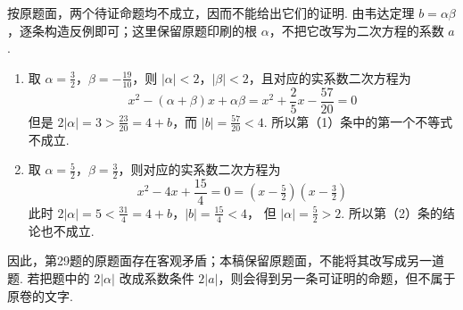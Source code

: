 \begin{solution}
按原题面，两个待证命题均不成立，因而不能给出它们的证明. 由韦达定理
\(b=\alpha\beta\)，逐条构造反例即可；这里保留原题印刷的根 \(\alpha\)，不把它改写为二次方程的系数 \(a\).

\begin{enumerate}
\item 取 \(\alpha=\frac{3}{2}\)，\(\beta=-\frac{19}{10}\)，则 \(|\alpha|<2\)，\(|\beta|<2\)，且对应的实系数二次方程为
\[
x^2-\left(\alpha+\beta\right)x+\alpha\beta=x^2+\frac{2}{5}x-\frac{57}{20}=0
\]
但是 \(2|\alpha|=3>\frac{23}{20}=4+b\)，而 \(|b|=\frac{57}{20}<4\).
所以第（1）条中的第一个不等式不成立.

\item 取 \(\alpha=\frac{5}{2}\)，\(\beta=\frac{3}{2}\)，则对应的实系数二次方程为
\[
x^2-4x+\frac{15}{4}=0=(x-\tfrac{5}{2})(x-\tfrac{3}{2})
\]
此时 \(2|\alpha|=5<\frac{31}{4}=4+b\)，\(|b|=\frac{15}{4}<4\)，
但 \(|\alpha|=\frac{5}{2}>2\). 所以第（2）条的结论也不成立.
\end{enumerate}

因此，第29题的原题面存在客观矛盾；本稿保留原题面，不能将其改写成另一道题. 若把题中的 \(2|\alpha|\) 改成系数条件 \(2|a|\)，则会得到另一条可证明的命题，但不属于原卷的文字.
\end{solution}
